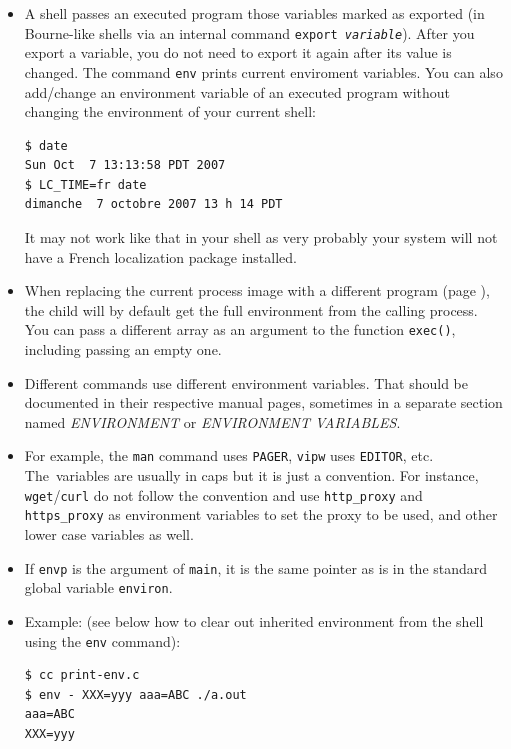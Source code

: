 \begin{itemize}
\item A shell passes an executed program those variables marked as exported
(in Bourne-like shells via an internal command \texttt{export \emph{variable}}).
After you export a variable, you do not need to export it again after its value
is changed.  The command \texttt{env} prints current enviroment variables.
You can also add/change an environment variable of an executed program without
changing the environment of your current shell:

\begin{verbatim}
$ date
Sun Oct  7 13:13:58 PDT 2007
$ LC_TIME=fr date
dimanche  7 octobre 2007 13 h 14 PDT
\end{verbatim}

It may not work like that in your shell as very probably your system will not
have a French localization package installed.
\item When replacing the current process image with a different program (page
\pageref{EXEC}), the child will by default get the full environment from the
calling process.  You can pass a different array as an argument to the function
\texttt{exec()}, including passing an empty one.
\item Different commands use different environment variables.  That should be
documented in their respective manual pages, sometimes in a separate section
named \emph{ENVIRONMENT} or \emph{ENVIRONMENT VARIABLES}.
\item For example, the \texttt{man} command uses \texttt{PAGER}, \texttt{vipw}
uses \texttt{EDITOR}, etc.  The~variables are usually in caps but it is just a
convention.  For instance, \texttt{wget}/\texttt{curl} do not follow the convention and use
\texttt{http\_proxy} and \texttt{https\_proxy} as environment variables to set
the proxy to be used, and other lower case variables as well.
\item If \texttt{envp} is the  argument of \texttt{main}, it is the same
pointer as is in the standard global variable \texttt{environ}.
\item Example:  (see below how to clear out inherited
environment from the shell using the \texttt{env} command):

\begin{verbatim}
$ cc print-env.c
$ env - XXX=yyy aaa=ABC ./a.out
aaa=ABC
XXX=yyy
\end{verbatim}
\end{itemize}


